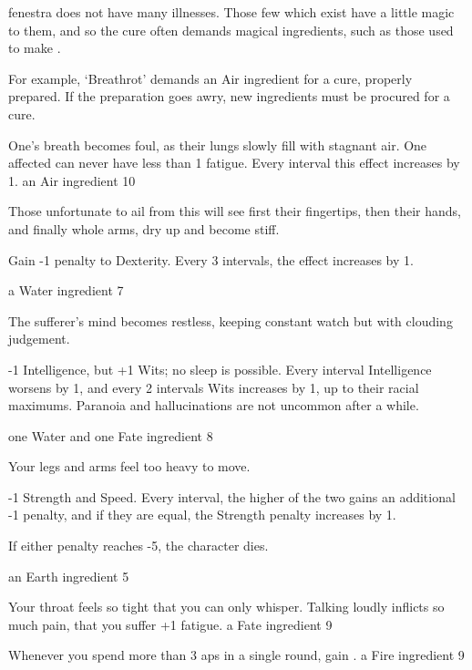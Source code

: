 \begin{multicols}{2}

\noindent
\Gls{fenestra} does not have many illnesses.
Those few which exist have a little magic to them, and so the cure often demands magical \glspl{ingredient}, such as those used to make .

For example, `Breathrot' demands an Air \gls{ingredient} for a cure, properly prepared.
If the preparation goes awry, new \glspl{ingredient} must be procured for a cure.

%
  {
    One's breath becomes foul, as their lungs slowly fill with stagnant air.
    One affected can never have less than 1 \gls{fatigue}.
    Every \gls{interval} this effect increases by 1.
  }%
  {an Air \gls{ingredient}}%
  {10}

%
  {
    Those unfortunate to ail from this will see first their fingertips, then their hands, and finally whole arms, dry up and become stiff.

    Gain -1 penalty to Dexterity.
    Every 3 \glspl{interval}, the effect increases by 1.
  }%
  {a Water \gls{ingredient}}%
  {7}

%
  {
    The sufferer's mind becomes restless, keeping constant watch but with clouding judgement.

    -1 Intelligence, but +1 Wits; no sleep is possible.
    Every \gls{interval} Intelligence worsens by 1, and every 2 \glspl{interval} Wits increases by 1, up to their racial maximums.%
    Paranoia and hallucinations are not uncommon after a while.
  }%
  {one Water and one Fate \gls{ingredient}}%
  {8}

%
  {Your legs and arms feel too heavy to move.

-1 Strength and Speed.
Every \gls{interval}, the higher of the two gains an additional -1 penalty, and if they are equal, the Strength penalty increases by 1.

  If either penalty reaches -5, the character dies.
  }%
{an Earth \gls{ingredient}}%
{5}

%
  {Your throat feels so tight that you can only whisper.
  Talking loudly inflicts so much pain, that you suffer +1 \gls{fatigue}.
  }%
{a Fate \gls{ingredient}}%
{9}

%
  {Whenever you spend more than 3 \glspl{ap} in a single round, gain .
  }%
  {a Fire \gls{ingredient}}%
  {9}

\end{multicols}

